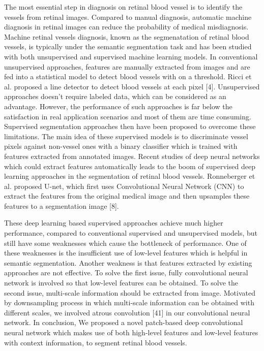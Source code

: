 \documentclass{article}
\begin{document}
The most essential step in diagnosis on retinal blood vessel is to identify the vessels from retinal images. Compared to manual diagnosis, automatic machine diagnosis in retinal images can reduce the probability of medical misdiagnosis. Machine retinal vessels diagnosis, known as the segmenatation of retinal blood vessels, is typically under the semantic segmentation task and has been studied with both unsupervised and supervised machine learning models. In conventional unsupervised approaches, features are manually extracted from images and are fed into a statistical model to detect blood vessels with on a threshold. Ricci et al. proposed a line detector to detect blood vessels at each pixel [4]. Unsupervised approaches doesn't require labeled data, which can be considered as an advantage. However, the performance of such approaches is far below the satisfaction in real application scenarios and most of them are time consuming. Supervised segmentation approaches then have been proposed to overcome these limitations. The main idea of these supervised models is to discriminate vessel pixels against non-vessel ones with a binary classifier which is trained with features extracted from annotated images. Recent studies of deep neural networks which could extract features automatically leads to the boom of supervised deep learning approaches in the segmentation of retinal blood vessels. Ronneberger et al. proposed U-net, which first uses Convolutional Neural Network (CNN) to extract the features from the original medical image and then upsamples these features to a segmentation image [8]. 

These deep learning based supervised approaches achieve much higher performance, compared to conventional supervised and unsupervised models, but still have some weaknesses which cause the bottleneck of performance. One of these weaknesses is the insufficient use of low-level features which is helpful in semantic segmentation. Another weakness is that features extracted by existing approaches are not effective. To solve the first issue, fully convolutional neural network is involved so that low-level features can be obtained. To solve the second issue, multi-scale information should be extracted from image. Motivated by downsampling process in which multi-scale information can be obtained with different scales, we involved atrous convolution [41] in our convolutional neural network. In conclusion, We proposed a novel patch-based deep convolutional neural network which makes use of both high-level features and low-level features with context information, to segment retinal blood vessels. 
\end{document}
